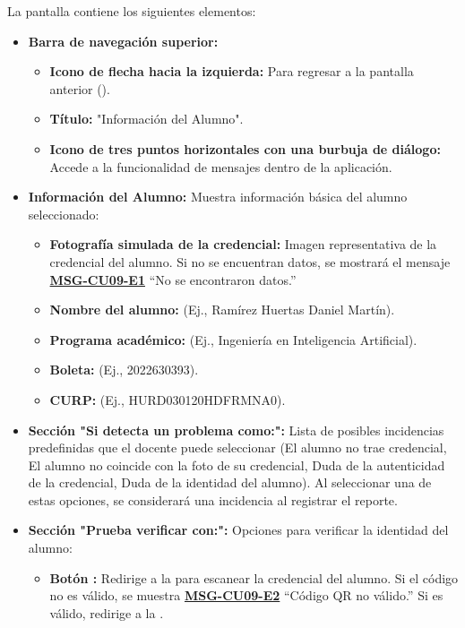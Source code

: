 La pantalla contiene los siguientes elementos:
\begin{itemize}
	\item \textbf{Barra de navegación superior:}
	\begin{itemize}
		\item \textbf{Icono de flecha hacia la izquierda:} Para regresar a la pantalla anterior ().
		\item \textbf{Título:} "Información del Alumno".
		\item \textbf{Icono de tres puntos horizontales con una burbuja de diálogo:} Accede a la funcionalidad de mensajes dentro de la aplicación.
	\end{itemize}
	\item \textbf{Información del Alumno:} Muestra información básica del alumno seleccionado:
	\begin{itemize}
		\item \textbf{Fotografía simulada de la credencial:} Imagen representativa de la credencial del alumno. Si no se encuentran datos, se mostrará el mensaje \textbf{\hyperref[msg:CU09-E1]{MSG-CU09-E1}} ``No se encontraron datos.''
		\item \textbf{Nombre del alumno:} (Ej., Ramírez Huertas Daniel Martín).
		\item \textbf{Programa académico:} (Ej., Ingeniería en Inteligencia Artificial).
		\item \textbf{Boleta:} (Ej., 2022630393).
		\item \textbf{CURP:} (Ej., HURD030120HDFRMNA0).
	\end{itemize}
	\item \textbf{Sección "Si detecta un problema como:":} Lista de posibles incidencias predefinidas que el docente puede seleccionar (El alumno no trae credencial, El alumno no coincide con la foto de su credencial, Duda de la autenticidad de la credencial, Duda de la identidad del alumno). Al seleccionar una de estas opciones, se considerará una incidencia al registrar el reporte.
	\item \textbf{Sección "Prueba verificar con:":} Opciones para verificar la identidad del alumno:
	\begin{itemize}
		\item \textbf{Botón :} Redirige a la  para escanear la credencial del alumno. Si el código no es válido, se muestra \textbf{\hyperref[msg:CU09-E2]{MSG-CU09-E2}} ``Código QR no válido.'' Si es válido, redirige a la .

\end{itemize}
\end{itemize}
